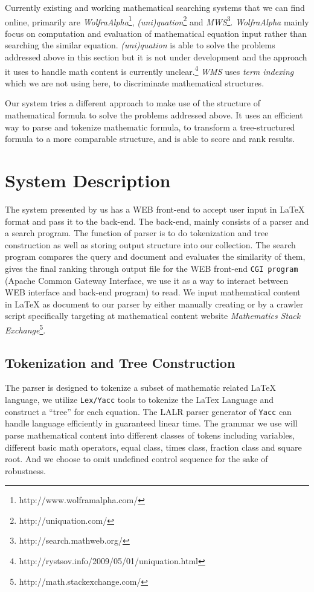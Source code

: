 \documentclass{acm_proc_article-sp}
\begin{document}
Currently existing and working mathematical searching systems that we can find online, primarily are \textit{WolfraAlpha}\footnote{http://www.wolframalpha.com/}, \textit{(uni)quation}\footnote{http://uniquation.com/} and \textit{MWS}\footnote{http://search.mathweb.org/}. \textit{WolfraAlpha} mainly focus on computation and evaluation of mathematical equation input rather than searching the similar equation. \textit{(uni)quation} is able to solve the problems addressed above in this section but it is not under development and the approach it uses to handle math content is currently unclear.\footnote{http://rystsov.info/2009/05/01/uniquation.html} \textit{WMS} uses \textit{term indexing}\cite{McCune, Stickel} which we are not using here, to discriminate mathematical structures.

Our system tries a different approach to make use of the structure of mathematical formula to solve the problems addressed above. It uses an efficient way to parse and tokenize mathematic formula, to transform a tree-structured formula to a more comparable structure, and is able to score and rank results.

\section{System Description}
The system presented by us has a WEB front-end to accept user input in \LaTeX{} format and pass it to the back-end. The back-end, mainly consists of a parser and a search program. The function of parser is to do tokenization and tree construction as well as storing output structure into our collection. The search program compares the query and document and evaluates the similarity of them, gives the final ranking through output file for the WEB front-end \texttt{CGI program} (Apache Common Gateway Interface, we use it as a way to interact between WEB interface and back-end program) to read. We input mathematical content in \LaTeX{} as document to our parser by either manually creating or by a crawler script specifically targeting at mathematical content website \textit{Mathematics Stack Exchange}\footnote{http://math.stackexchange.com/}.

\subsection{Tokenization and Tree Construction}
The parser is designed to tokenize a subset of mathematic related \LaTeX{} language, we utilize \texttt{Lex/Yacc} tools to tokenize the LaTex Language and construct a ``tree'' for each equation. The LALR parser generator of \texttt{Yacc} can handle language efficiently in guaranteed linear time\cite{Knuth}. The grammar we use will parse mathematical content into different classes of tokens including variables, different basic math operators, equal class, times class, fraction class and square root. And we choose to omit undefined control sequence for the sake of robustness. 
\end{document}
